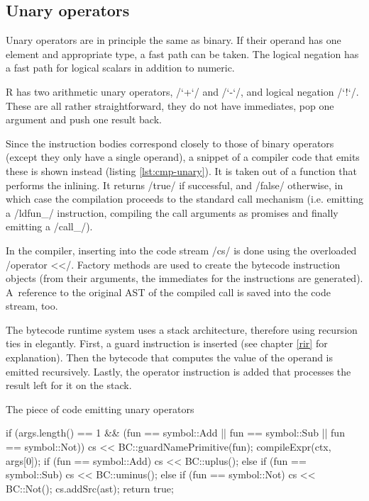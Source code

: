 
\subsection{Unary operators}

Unary operators are in principle the same as binary. If their operand has one element and appropriate type, a fast path can be taken. The logical negation has a fast path for logical scalars in addition to numeric.

R has two arithmetic unary operators, \rinline/`+`/ and \rinline/`-`/, and logical negation \rinline/`!`/. These are all rather straightforward, they do not have immediates, pop one argument and push one result back.

Since the instruction bodies correspond closely to those of binary operators (except they only have a single operand), a snippet of a compiler code that emits these is shown instead (listing \ref{lst:cmp-unary}). It is taken out of a function that performs the inlining. It returns \cppinline/true/ if successful, and \cppinline/false/ otherwise, in which case the compilation proceeds to the standard call mechanism (i.e. emitting a \cinline/ldfun_/ instruction, compiling the call arguments as promises and finally emitting a \cinline/call_/).

In the compiler, inserting into the code stream \cppinline/cs/ is done using the overloaded \cppinline/operator <</. Factory methods are used to create the bytecode instruction objects (from their arguments, the immediates for the instructions are generated). A~reference to the original AST of the compiled call is saved into the code stream, too.

The bytecode runtime system uses a stack architecture, therefore using recursion ties in elegantly. First, a guard instruction is inserted (see chapter \ref{rir} for explanation). Then the bytecode that computes the value of the operand is emitted recursively. Lastly, the operator instruction is added that processes the result left for it on the stack.

\begin{listing}[htbp]
  \caption{\label{lst:cmp-unary}The piece of code emitting unary operators}
  \begin{cppcode}
if (args.length() == 1 &&
    (fun == symbol::Add || fun == symbol::Sub ||
     fun == symbol::Not)) {
    cs << BC::guardNamePrimitive(fun);
    compileExpr(ctx, args[0]);
    if (fun == symbol::Add)
        cs << BC::uplus();
    else if (fun == symbol::Sub)
        cs << BC::uminus();
    else if (fun == symbol::Not)
        cs << BC::Not();
    cs.addSrc(ast);
    return true;
}
  \end{cppcode}
\end{listing}

